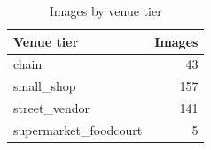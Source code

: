 \begin{table}[t]
\centering
\caption{Images by venue tier}
\label{tab:venue}
\small
\begin{tabular}{lr}
\toprule
Venue tier & Images \\
\midrule
chain & 43 \\
small\_shop & 157 \\
street\_vendor & 141 \\
supermarket\_foodcourt & 5 \\
\bottomrule
\end{tabular}
\end{table}
